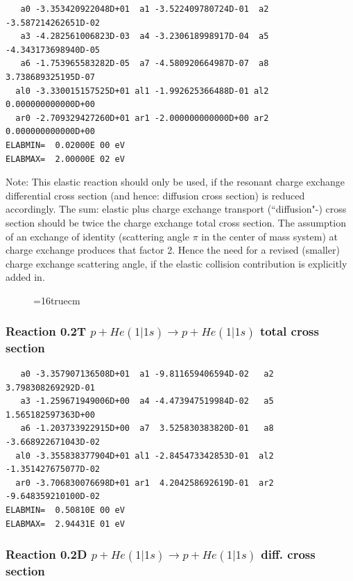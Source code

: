 \documentclass[12pt,dvips]{article}
\begin{document}
\begin{small}\begin{verbatim}
   a0 -3.353420922048D+01  a1 -3.522409780724D-01  a2 -3.587214262651D-02
   a3 -4.282561006823D-03  a4 -3.230618998917D-04  a5 -4.343173698940D-05
   a6 -1.753965583282D-05  a7 -4.580920664987D-07  a8  3.738689325195D-07
  al0 -3.330015157525D+01 al1 -1.992625366488D-01 al2  0.000000000000D+00
  ar0 -2.709329427260D+01 ar1 -2.000000000000D+00 ar2  0.000000000000D+00
ELABMIN=  0.02000E 00 eV
ELABMAX=  2.00000E 02 eV
\end{verbatim}\end{small}
Note: This elastic reaction should only be used, if the resonant charge
exchange differential cross section (and hence: diffusion cross section)
is reduced accordingly. The sum: elastic plus charge exchange transport
(``diffusion"-) cross section should be twice the charge exchange total
cross section. The assumption of an exchange of identity (scattering
angle $\pi$ in the center of mass system) at charge exchange produces
that factor 2. Hence the need for a revised (smaller) charge exchange
scattering angle, if the elastic collision contribution is explicitly
added in.

\begin{figure} \label{0.1}
\epsfxsize=16truecm
\end{figure}
\newpage

\subsubsection{
Reaction 0.2T   $ p + He(1|1s) \rightarrow p + He (1|1s)$ total cross section
}



\begin{small}\begin{verbatim}
   a0 -3.357907136508D+01  a1 -9.811659406594D-02   a2  3.798308269292D-01
   a3 -1.259671949006D+00  a4 -4.473947519984D-02   a5  1.565182597363D+00
   a6 -1.203733922915D+00  a7  3.525830383820D-01   a8 -3.668922671043D-02
  al0 -3.355838377904D+01 al1 -2.845473342853D-01  al2 -1.351427675077D-02
  ar0 -3.706830076698D+01 ar1  4.204258692619D-01  ar2 -9.648359210100D-02
ELABMIN=  0.50810E 00 eV
ELABMAX=  2.94431E 01 eV
\end{verbatim}\end{small}

\subsubsection{
Reaction 0.2D    $p + He(1|1s) \rightarrow p + He (1|1s) $ diff. cross
section }
\end{document}
